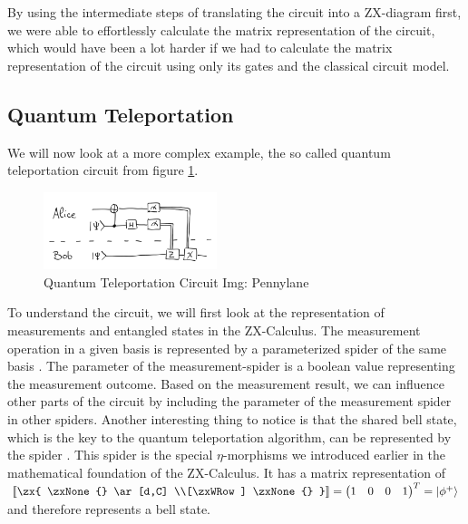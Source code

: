 By using the intermediate steps of translating the circuit into a ZX-diagram first, we were able to effortlessly calculate the matrix representation of the circuit, which would have been a lot harder if we had to calculate the matrix representation of the circuit using only its gates and the classical circuit model.

\subsection{Quantum Teleportation}

We will now look at a more complex example, the so called quantum teleportation circuit from figure \ref{fig:teleportation-classic}.

\begin{figure}[h]
    \centering
    \includegraphics[width=0.45\textwidth]{images/teleportation-classic.png}
    \caption{Quantum Teleportation Circuit Img: Pennylane\cite{pennylane2023zx}}
    \label{fig:teleportation-classic}
\end{figure}

To understand the circuit, we will first look at the representation of measurements and entangled states in the ZX-Calculus.
The measurement operation in a given basis is represented by  a parameterized spider of the same basis \cite{vandewetering2020zxcalculus}. The parameter of the measurement-spider is a boolean value representing the measurement outcome. Based on the measurement result, we can influence other parts of the circuit by including the parameter of the measurement spider in other spiders.
Another interesting thing to notice is that the shared bell state, which is the key to the quantum teleportation algorithm, can be represented by the spider
\zx{
    \zxNone{} \ar[d,C] \\[\zxWRow] \zxNone{}
}. This spider is the special $\eta$-morphisms we introduced earlier in the mathematical foundation of the ZX-Calculus. It has a matrix representation of
$
    \left \llbracket
    \zx{
        \zxNone{} \ar[d,C] \\[\zxWRow] \zxNone{}
    }
    \right \rrbracket =
    \begin{pmatrix}
        1 & 0 & 0 & 1 \\
    \end{pmatrix}^T = |\phi^+\rangle
$ and therefore represents a bell state.

